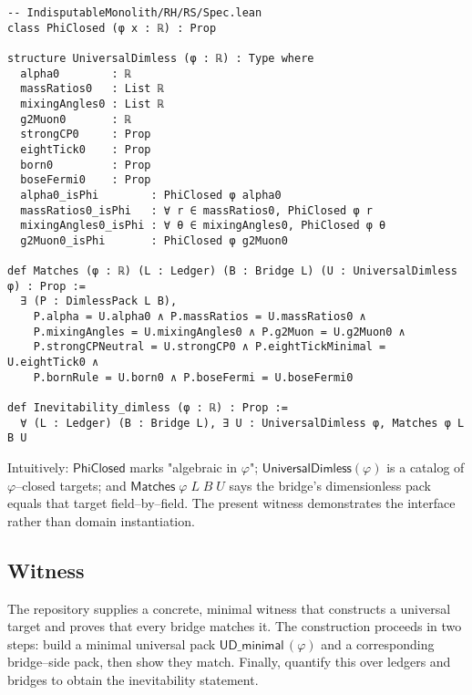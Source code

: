 \documentclass[11pt,a4paper,twoside]{article}
\numberwithin{equation}{section}
\newcommand{\phigr}{\varphi} %
\theoremstyle{customthm}
\theoremstyle{customdef}
\theoremstyle{customrem}
\begin{document}
\begin{lstlisting}
-- IndisputableMonolith/RH/RS/Spec.lean
class PhiClosed (φ x : ℝ) : Prop

structure UniversalDimless (φ : ℝ) : Type where
  alpha0        : ℝ
  massRatios0   : List ℝ
  mixingAngles0 : List ℝ
  g2Muon0       : ℝ
  strongCP0     : Prop
  eightTick0    : Prop
  born0         : Prop
  boseFermi0    : Prop
  alpha0_isPhi        : PhiClosed φ alpha0
  massRatios0_isPhi   : ∀ r ∈ massRatios0, PhiClosed φ r
  mixingAngles0_isPhi : ∀ θ ∈ mixingAngles0, PhiClosed φ θ
  g2Muon0_isPhi       : PhiClosed φ g2Muon0

def Matches (φ : ℝ) (L : Ledger) (B : Bridge L) (U : UniversalDimless φ) : Prop :=
  ∃ (P : DimlessPack L B),
    P.alpha = U.alpha0 ∧ P.massRatios = U.massRatios0 ∧
    P.mixingAngles = U.mixingAngles0 ∧ P.g2Muon = U.g2Muon0 ∧
    P.strongCPNeutral = U.strongCP0 ∧ P.eightTickMinimal = U.eightTick0 ∧
    P.bornRule = U.born0 ∧ P.boseFermi = U.boseFermi0

def Inevitability_dimless (φ : ℝ) : Prop :=
  ∀ (L : Ledger) (B : Bridge L), ∃ U : UniversalDimless φ, Matches φ L B U
\end{lstlisting}

\noindent Intuitively: $\mathsf{PhiClosed}$ marks "algebraic in $\phigr$"; $\mathsf{UniversalDimless}(\phigr)$ is a catalog of $\phigr$–closed targets; and $\mathsf{Matches}\;\phigr\;L\;B\;U$ says the bridge's dimensionless pack equals that target field–by–field. The present witness demonstrates the interface rather than domain instantiation.

\subsection{Witness}

The repository supplies a concrete, minimal witness that constructs a universal target and proves that every bridge matches it. The construction proceeds in two steps: build a minimal universal pack $\mathsf{UD\_minimal}\,(\phigr)$ and a corresponding bridge–side pack, then show they match. Finally, quantify this over ledgers and bridges to obtain the inevitability statement.
\end{document}

